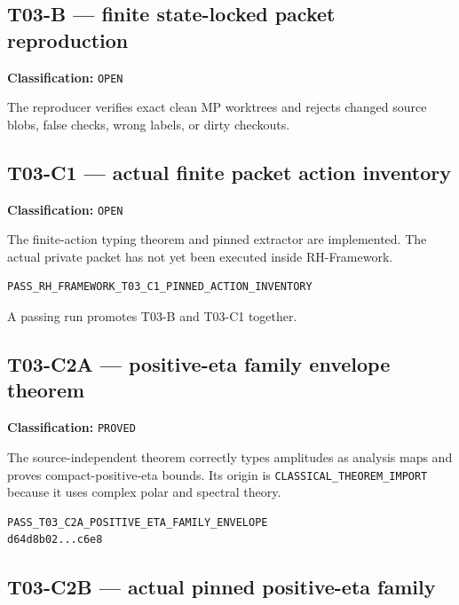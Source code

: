 \hypertarget{t03-b-finite-state-locked-packet-reproduction}{%
\subsection{T03-B --- finite state-locked packet reproduction}\label{t03-b-finite-state-locked-packet-reproduction}}

\textbf{Classification:} \texttt{OPEN}

The reproducer verifies exact clean MP worktrees and rejects changed source
blobs, false checks, wrong labels, or dirty checkouts.

\hypertarget{t03-c1-actual-finite-packet-action-inventory}{%
\subsection{T03-C1 --- actual finite packet action inventory}\label{t03-c1-actual-finite-packet-action-inventory}}

\textbf{Classification:} \texttt{OPEN}

The finite-action typing theorem and pinned extractor are implemented. The
actual private packet has not yet been executed inside RH-Framework.

\begin{verbatim}
PASS_RH_FRAMEWORK_T03_C1_PINNED_ACTION_INVENTORY
\end{verbatim}

A passing run promotes T03-B and T03-C1 together.

\hypertarget{t03-c2a-positive-eta-family-envelope-theorem}{%
\subsection{T03-C2A --- positive-eta family envelope theorem}\label{t03-c2a-positive-eta-family-envelope-theorem}}

\textbf{Classification:} \texttt{PROVED}

The source-independent theorem correctly types amplitudes as analysis maps and
proves compact-positive-eta bounds. Its origin is
\texttt{CLASSICAL\_THEOREM\_IMPORT} because it uses complex polar and spectral theory.

\begin{verbatim}
PASS_T03_C2A_POSITIVE_ETA_FAMILY_ENVELOPE
d64d8b02...c6e8
\end{verbatim}

\hypertarget{t03-c2b-actual-pinned-positive-eta-family}{%
\subsection{T03-C2B --- actual pinned positive-eta family}\label{t03-c2b-actual-pinned-positive-eta-family}}

